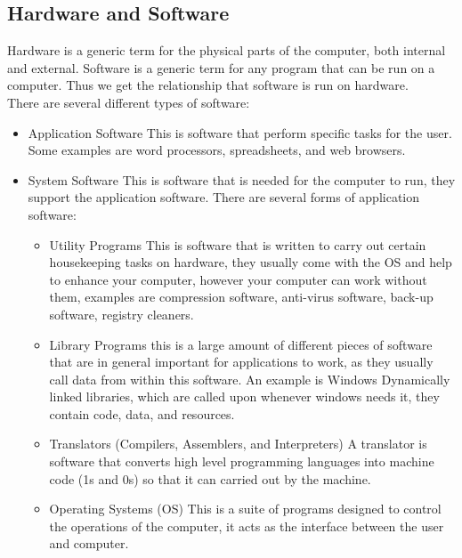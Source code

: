 \subsection{Hardware and Software}
  \noindent
  Hardware is a generic term for the physical parts of the computer, both internal and external. Software is a generic term for any program that can be run on a computer. Thus we get the relationship that software is run on hardware.\\
  There are several different types of software:
  \begin{itemize}
    \setlength{\itemsep}{0em}
    \item Application Software
      \subitem This is software that perform specific tasks for the user. Some examples are word processors, spreadsheets, and web browsers.
    \item {} System Software
      \subitem This is software that is needed for the computer to run, they support the application software. There are several forms of application software:
      \begin{itemize}
        \setlength{\itemsep}{0em}
        \item Utility Programs
        \subitem This is software that is written to carry out certain housekeeping tasks on hardware, they usually come with the OS and help to enhance your computer, however your computer can work without them, examples are compression software, anti-virus software, back-up software, registry cleaners.
        \item Library Programs
        \subitem this is a large amount of different pieces of software that are in general important for applications to work, as they usually call data from within this software. An example is Windows Dynamically linked libraries, which are called upon whenever windows needs it, they contain code, data, and resources.
        \item Translators (Compilers, Assemblers, and Interpreters)
        \subitem A translator is software that converts high level programming languages into machine code (1s and 0s) so that it can carried out by the machine.
        \item Operating Systems (OS)
        \subitem This is a suite of programs designed to control the operations of the computer, it acts as the interface between the user and computer.
      \end{itemize}
  \end{itemize}

